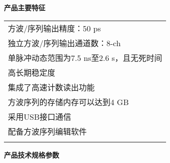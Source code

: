 \makeatletter
\def\hlinewd#1{%
  \noalign{\ifnum0=`}\fi\hrule \@height #1 \futurelet
   \reserved@a\@xhline}
\makeatother
\noindent\sanhao\textbf{产品主要特征}
\vspace{0.3cm}
\song
\begin{table}[H]
\normalsize
{}
\begin{tabular}{m{13.5cm}}
\rowcolor{gray!20}
\arrayrulecolor{tabcolor_top}\toprule[1.8pt]
方波/序列输出精度：50 ps\\\arrayrulecolor{tabcolor}\midrule[1.2pt]
独立方波/序列输出通道数：8-ch \\\arrayrulecolor{tabcolor}\midrule[1.2pt]
单脉冲动态范围为7.5 ns至2.6 s，且无死时间\\\arrayrulecolor{tabcolor}\midrule[1.2pt]
高长期稳定度\\\arrayrulecolor{tabcolor}\midrule[1.2pt]
集成了高速计数读出功能\\\arrayrulecolor{tabcolor}\midrule[1.2pt]
方波序列的存储内存可以达到4 GB\\\arrayrulecolor{tabcolor}\midrule[1.2pt]
采用USB接口通信\\\arrayrulecolor{tabcolor}\midrule[1.2pt]
配备方波序列编辑软件\\
\arrayrulecolor{tabcolor_top}\bottomrule[1.8pt]
\end{tabular}
\end{table}


\newpage
\noindent\sanhao\textbf{产品技术规格参数}
\vspace{0.5cm}

